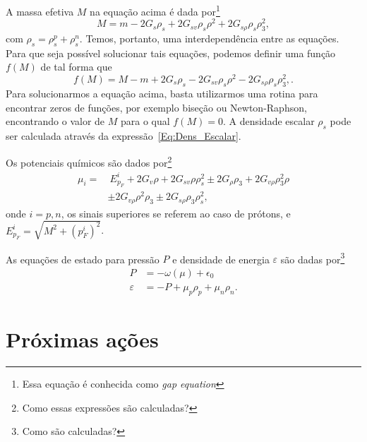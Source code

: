 A massa efetiva $M$ na equação acima é dada por\footnote{Essa equação é conhecida como \emph{gap equation}}
\begin{equation}\label{Eq:Gap}
	M = m - 2G_s\rho_s + 2G_{sv}\rho_s\rho^2 + 2 G_{s\rho}\rho_s\rho_3^2,
\end{equation}
%
com $\rho_s = \rho_s^p + \rho_s^n$. Temos, portanto, uma interdependência entre as equações. Para que seja possível solucionar tais equações, podemos definir uma função $f(M)$ de tal forma que
\begin{equation}\label{Eq:Gap_zero}
	f(M) = M - m + 2G_s\rho_s - 2G_{sv}\rho_s\rho^2 - 2 G_{s\rho}\rho_s\rho_3^2,.
\end{equation}
%
Para solucionarmos a equação acima, basta utilizarmos uma rotina para encontrar zeros de funções, por exemplo biseção ou Newton-Raphson, encontrando o valor de $M$ para o qual $f(M) = 0$. A densidade escalar $\rho_s$ pode ser calculada através da expressão~\eqref{Eq:Dens_Escalar}.

Os potenciais químicos são dados por\footnote{Como essas expressões são calculadas?}
\begin{equation}\label{Eq:Potenciais_Quimicos}
\begin{split}
	\mu_i =&~ E_{p_F}^i + 2G_v\rho + 2G_{sv}\rho\rho_s^2 \pm 2G_\rho\rho_3+2G_{v\rho}\rho_3^2\rho \\
	& \pm 2G_{v\rho}\rho^2\rho_3 \pm 2 G_{s\rho}\rho_3\rho_s^2,
\end{split}
\end{equation}
%
onde $i = p,n$, os sinais superiores se referem ao caso de prótons, e $E_{p_F}^i = \sqrt{M^2 + (p_F^i)^2}$.

As equações de estado para pressão $P$ e densidade de energia $\varepsilon$ são dadas por\footnote{Como são calculadas?}
\begin{align}
	P &= -\omega(\mu) + \epsilon_0 \label{Eq:Pressao}\\
	\varepsilon &= -P + \mu_p\rho_p + \mu_n\rho_n. \label{Eq:Densidade_energia}
\end{align}


\section{Próximas ações}

